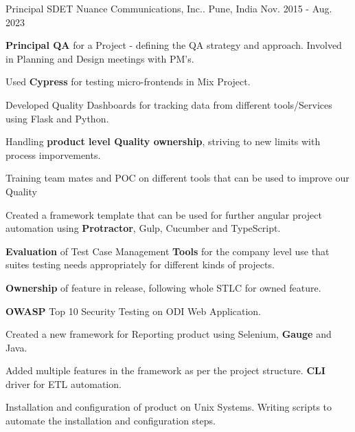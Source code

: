 \begin{cventries}
  \cventry
    {Principal SDET} %
    {Nuance Communications, Inc..} %
    {Pune, India} %
    {Nov. 2015 - Aug. 2023} %
    {
      \begin{cvitems} %
	    \item {\textbf{Principal QA} for a Project - defining the QA strategy and approach. Involved in Planning and Design meetings with PM's.}
	    \item {Used \textbf{Cypress} for testing micro-frontends in Mix Project.}
	    \item {Developed Quality Dashboards for tracking data from different tools/Services using Flask and Python.}
	    \item {Handling \textbf{product level Quality ownership}, striving to new limits with process imporvements.}
	    \item {Training team mates and POC on different tools that can be used to improve our Quality}
		  \item {Created a framework template that can be used for further angular project automation using \textbf{Protractor}, Gulp, Cucumber and TypeScript.}
		  \item {\textbf{Evaluation} of Test Case Management \textbf{Tools} for the company level use that suites testing needs appropriately for different kinds of projects.}
      \item {\textbf{Ownership} of feature in release, following whole STLC for owned feature.}
		  \item {\textbf{OWASP} Top 10 Security Testing on ODI Web Application.}
      \item {Created a new framework for Reporting product using Selenium, \textbf{Gauge} and Java.}
      \item {Added multiple features in the framework as per the project structure. \textbf{CLI} driver for ETL automation.}
      \item {Installation and configuration of product on Unix Systems. Writing scripts to automate the installation and configuration steps.}
      \end{cvitems}
    }


\end{cventries}
